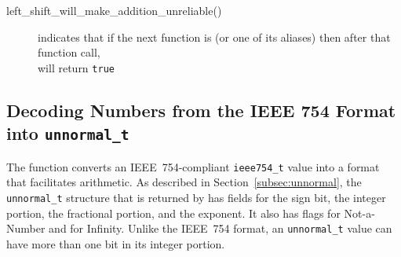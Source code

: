 \begin{itemize}
    \begin{description}
        \item[left\_shift\_will\_make\_addition\_unreliable()] indicates that if the next function is  (or one of its aliases) then after that function call, \\  will return \lstinline{true}
    \end{description}
\end{itemize}

\subsection{Decoding Numbers from the IEEE 754 Format into \texttt{unnormal\_t}}

The  function converts an IEEE~754-compliant \lstinline{ieee754_t} value into a format that facilitates arithmetic.
As described in Section~\ref{subsec:unnormal}, the \lstinline{unnormal_t} structure that is returned by  has fields for the sign bit, the integer portion, the fractional portion, and the exponent.
It also has flags for Not-a-Number and for Infinity.
Unlike the IEEE~754 format, an \lstinline{unnormal_t} value can have more than one bit in its integer portion.

